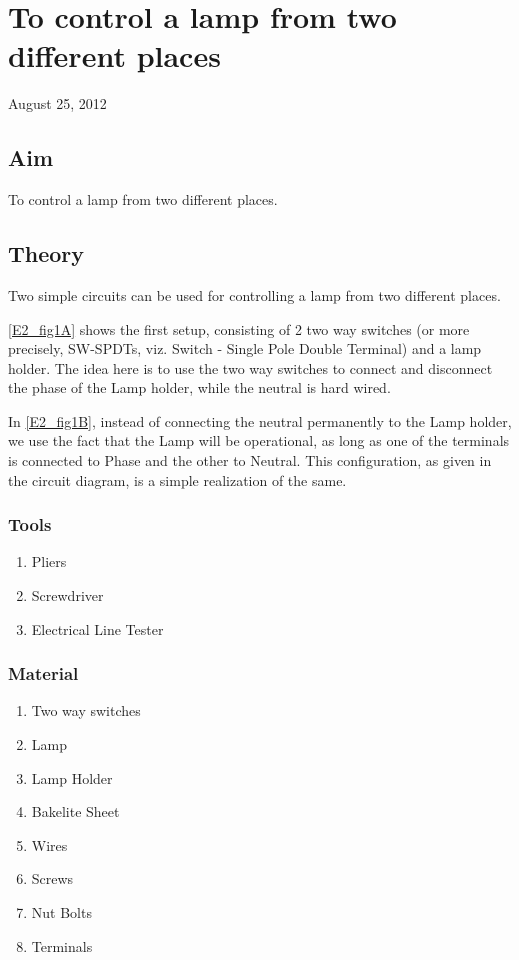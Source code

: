 \chapter{To control a lamp from two different places}
\begin{flushright}
August 25, 2012
\end{flushright}
\section{Aim}
To control a lamp from two different places.

\section{Theory}
	Two simple circuits can be used for controlling a lamp from two different places. 
	\par
	\autoref{E2_fig1A} shows the first setup, consisting of 2 two way switches (or more precisely, SW-SPDTs, viz. Switch - Single Pole Double Terminal) and a lamp holder. The idea here is to use the two way switches to connect and disconnect the phase of the Lamp holder, while the neutral is hard wired.
	\par
	In \autoref{E2_fig1B}, instead of connecting the neutral permanently to the Lamp holder, we use the fact that the Lamp will be operational, as long as one of the terminals is connected to Phase and the other to Neutral. This configuration, as given in the circuit diagram, is a simple realization of the same.
	\subsection {Tools}
		\begin{enumerate}
			\item Pliers
			\item Screwdriver
			\item Electrical Line Tester
		\end{enumerate}
	\subsection {Material}
		\begin{enumerate}
			\item Two way switches
			\item Lamp
			\item Lamp Holder
			\item Bakelite Sheet
			\item Wires
			\item Screws
			\item Nut Bolts
			\item Terminals
		\end{enumerate}
